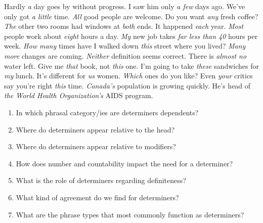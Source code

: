 \ea \label{ex:determiners}
    \ea Hardly \emph{a} day goes by without progress.
    \ex I saw him only \emph{a few} days ago.
    \ex We've only got \emph{a little} time.
    \ex \emph{All} good people are welcome.
    \ex Do you want \emph{any} fresh coffee?
    \ex \emph{The} other two rooms had windows at \emph{both} ends.
    \ex It happened \emph{each} year.
    \ex \emph{Most} people work about \emph{eight} hours a day.
    \ex \emph{My} new job takes \emph{far less than 40} hours per week.
    \ex \emph{How many} times have I walked down \emph{this} street where you lived?
    \ex \emph{Many more} changes are coming.
    \ex \emph{Neither} definition seems correct.
    \ex There is \emph{almost no} water left.
    \ex Give me \emph{that} book, not \emph{this} one.
    \ex I'm going to take \emph{these} sandwiches for \emph{my} lunch.
    \ex It's different for \emph{us} women.
    \ex \emph{Which} ones do you like?
    \ex Even \emph{your} critics say you're right \emph{this} time.
    \ex \emph{Canada's} population is growing quickly.
    \ex He's head of \emph{the World Health Organization's} AIDS program.
    \z
\z

\begin{enumerate}[noitemsep]
    \item In which phrasal category/ies are determiners dependents?
    \item Where do determiners appear relative to the head?
    \item Where do determiners appear relative to modifiers?
    \item How does number and countability impact the need for a determiner?
    \item What is the role of determiners regarding definiteness?
    \item What kind of agreement do we find for determiners?
    \item What are the phrase types that most commonly function as determiners?
\end{enumerate}

